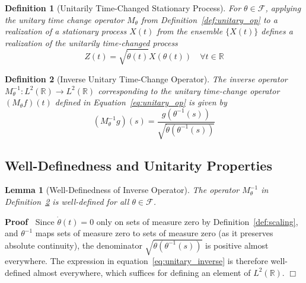 \documentclass{article}
\newenvironment{proof}{\noindent\textbf{Proof\ }}{\hspace*{\fill}$\Box$\medskip}
\newtheorem{definition}{Definition}
\newtheorem{lemma}{Lemma}
{\theorembodyfont{\rmfamily}\newtheorem{remark}{Remark}}
\begin{document}
\begin{definition}
  [Unitarily Time-Changed Stationary Process]\label{def:time_changed_proc} For
  $\theta \in \mathcal{F}$, applying the unitary time change operator
  $M_{\theta}$ from Definition~\ref{def:unitary_op} to a realization of a
  stationary process $X (t)$ from the ensemble $\{X (t)\}$ defines a
  realization of the unitarily time-changed process
  \begin{equation}
    \label{eq:time_change} Z (t) = \sqrt{\dot{\theta} (t)} X (\theta (t))
    \quad \forall t \in \mathbb{R}
  \end{equation}
\end{definition}

\begin{definition}
  [Inverse Unitary Time-Change Operator]\label{def:inverse_unitary_op} The
  inverse operator $M_{\theta}^{- 1} : L^2 (\mathbb{R}) \to L^2 (\mathbb{R})$
  corresponding to the unitary time-change operator $(M_{\theta} f) (t)$
  defined in Equation~\eqref{eq:unitary_op} is given by
  \begin{equation}
    \label{eq:unitary_inverse} (M_{\theta}^{- 1} g) (s) = \frac{g (\theta^{-
    1} (s))}{\sqrt{\dot{\theta} (\theta^{- 1} (s))}}
  \end{equation}
\end{definition}

\subsection{Well-Definedness and Unitarity Properties}

\begin{lemma}
  [Well-Definedness of Inverse Operator]\label{lem:inverse_well_defined} The
  operator $M_{\theta}^{- 1}$ in Definition~\ref{def:inverse_unitary_op} is
  well-defined for all $\theta \in \mathcal{F}$.
\end{lemma}

\begin{proof}
  Since $\dot{\theta} (t) = 0$ only on sets of measure zero by
  Definition~\ref{def:scaling}, and $\theta^{- 1}$ maps sets of measure zero
  to sets of measure zero (as it preserves absolute continuity), the
  denominator $\sqrt{\dot{\theta} (\theta^{- 1} (s))}$ is positive almost
  everywhere. The expression in equation~\eqref{eq:unitary_inverse} is
  therefore well-defined almost everywhere, which suffices for defining an
  element of $L^2 (\mathbb{R})$.
\end{proof}
\end{document}
